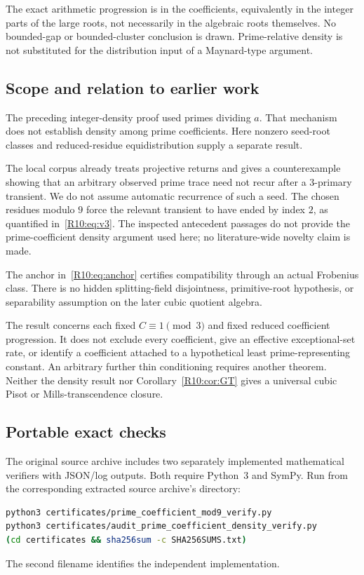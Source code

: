\documentclass[11pt,a4paper]{article}
\theoremstyle{definition}\newtheorem{definition}[theorem]{Definition}
\theoremstyle{remark}\newtheorem{remark}[theorem]{Remark}
\begin{document}
The exact arithmetic progression is in the coefficients, equivalently
in the integer parts of the large roots, not necessarily in the algebraic
roots themselves. No bounded-gap or bounded-cluster conclusion is drawn.
Prime-relative density is not substituted for the distribution input of
a Maynard-type argument.

\subsection{Scope and relation to earlier work}

The preceding integer-density proof used primes dividing $a$.
That mechanism does not establish density among prime coefficients.
Here nonzero seed-root classes and reduced-residue equidistribution
supply a separate result.

The local corpus \cite{K031} already treats projective returns and gives
a counterexample showing that an arbitrary observed prime trace need not
recur after a $3$-primary transient.
We do not assume automatic recurrence of such a seed.
The chosen residues modulo $9$ force the relevant transient to have
ended by index $2$, as quantified in~\eqref{R10:eq:v3}.
The inspected antecedent passages do not provide the prime-coefficient
density argument used here; no literature-wide novelty claim is made.

The anchor in~\eqref{R10:eq:anchor} certifies compatibility through an actual
Frobenius class. There is no hidden splitting-field disjointness,
primitive-root hypothesis, or separability assumption on the later
cubic quotient algebra.

The result concerns each fixed $C\equiv1\pmod3$ and fixed reduced
coefficient progression. It does not exclude every coefficient,
give an effective exceptional-set rate, or identify a coefficient attached
to a hypothetical least prime-representing constant.
An arbitrary further thin conditioning requires another theorem.
Neither the density result nor Corollary~\ref{R10:cor:GT} gives a universal
cubic Pisot or Mills-transcendence closure.


\subsection{Portable exact checks}\label{R10:app:certificates}

The original source archive includes two separately implemented mathematical verifiers
with JSON/log outputs. Both require Python~3 and SymPy.
Run from the corresponding extracted source archive's directory:
\begin{lstlisting}[language=bash]
python3 certificates/prime_coefficient_mod9_verify.py
python3 certificates/audit_prime_coefficient_density_verify.py
(cd certificates && sha256sum -c SHA256SUMS.txt)
\end{lstlisting}
The second filename identifies the independent implementation.
\end{document}
